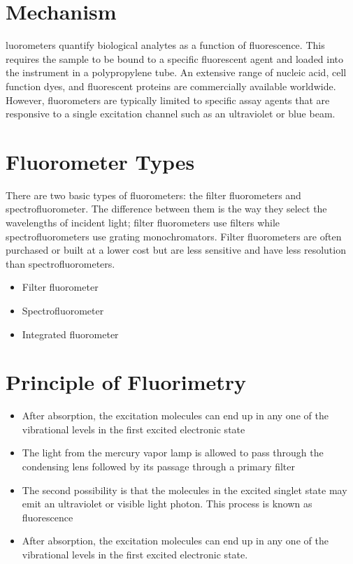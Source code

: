 \documentclass[11pt]{article}
\begin{document}
\section*{Mechanism}
luorometers quantify biological analytes as a function of fluorescence. This requires the sample to be bound to a specific fluorescent agent and loaded into the instrument in a polypropylene tube. An extensive range of nucleic acid, cell function dyes, and fluorescent proteins are commercially available worldwide. However, fluorometers are typically limited to specific assay agents that are responsive to a single excitation channel such as an ultraviolet or blue beam.

\section*{Fluorometer Types}
There are two basic types of fluorometers: the filter fluorometers and spectrofluorometer. The difference between them is the way they select the wavelengths of incident light; filter fluorometers use filters while spectrofluorometers use grating monochromators. Filter fluorometers are often purchased or built at a lower cost but are less sensitive and have less resolution than spectrofluorometers. 
\begin{itemize}
\item Filter fluorometer
\item Spectrofluorometer
\item Integrated fluorometer
\end{itemize}

\section*{Principle of Fluorimetry}
\begin{itemize}
\item After absorption, the excitation molecules can end up in any one of the vibrational levels in the first excited electronic state
\item The light from the mercury vapor lamp is allowed to pass through the condensing lens followed by its passage through a primary filter
\item  The second possibility is that the molecules in the excited singlet state may emit an ultraviolet or visible light photon. This process is known as fluorescence
\item After absorption, the excitation molecules can end up in any one of the vibrational levels in the first excited electronic state.


\end{itemize}
\end{document}
